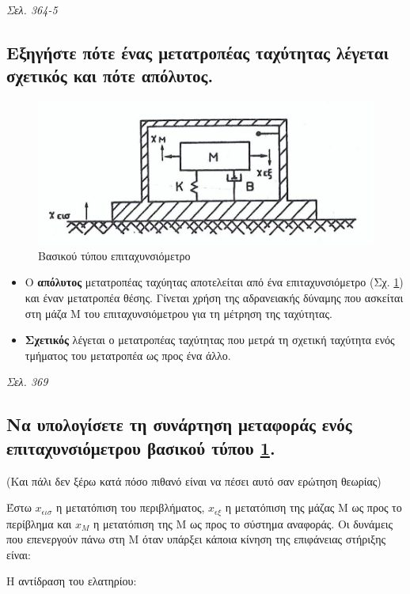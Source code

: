 \documentclass{article}
\begin{document}
\emph{Σελ. 364-5}

\subsection{Εξηγήστε πότε ένας μετατροπέας ταχύτητας λέγεται σχετικός και πότε απόλυτος.}

\begin{figure}[h!]
    \includegraphics[width=\linewidth]{epitaxinsiometro.png}
    \caption{Βασικού τύπου επιταχυνσιόμετρο}
    \label{fig:5.1epitax}
\end{figure}

\begin{itemize}
    \item Ο \textbf{απόλυτος} μετατροπέας ταχύητας αποτελείται από ένα επιταχυνσιόμετρο (Σχ. \ref{fig:5.1epitax}) και έναν μετατροπέα θέσης.
        Γίνεται χρήση της  αδρανειακής δύναμης που ασκείται στη μάζα Μ του επιταχυνσιόμετρου για τη μέτρηση της ταχύτητας.
    \item \textbf{Σχετικός} λέγεται ο μετατροπέας ταχύτητας που μετρά τη σχετική ταχύτητα ενός τμήματος του μετατροπέα ως προς ένα άλλο.
\end{itemize}

\emph{Σελ. 369}

\subsection{Να υπολογίσετε τη συνάρτηση μεταφοράς ενός επιταχυνσιόμετρου βασικού τύπου \ref{fig:5.1epitax}.}
(Και πάλι δεν ξέρω κατά πόσο πιθανό είναι να πέσει αυτό σαν ερώτηση θεωρίας)

Έστω $x_{\epsilon\iota\sigma}$ η μετατόπιση του περιβλήματος, $x_{\epsilon\xi}$ η μετατόπιση της μάζας Μ ως προς το περίβλημα και $x_M$
η μετατόπιση της Μ ως προς το σύστημα αναφοράς. Οι δυνάμεις που επενεργούν πάνω στη Μ όταν υπάρξει κάποια κίνηση της επιφάνειας στήριξης 
είναι:

Η αντίδραση του ελατηρίου:
\end{document}

